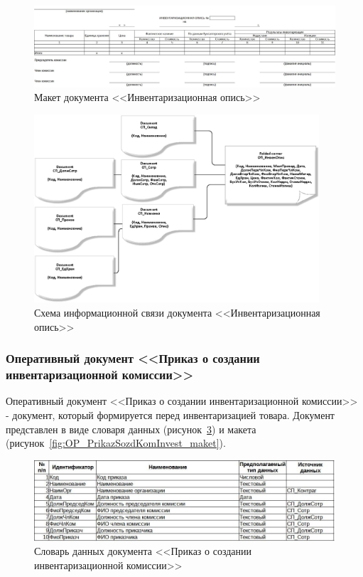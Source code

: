 \begin{figure}[!h]
    \centering
    \includegraphics[width=14cm]
        {_docs/ОП_ИнвенОпис_макет.jpg}
    \caption{Макет документа <<Инвентаризационная опись>>}
    \label{fig:OP_InvenOpis_maket}
\end{figure}

\begin{figure}[!h]
    \centering
    \includegraphics[height=7cm]
        {_docs/ОП_ИнвенОпис_связи.png}
    \caption{Схема информационной связи документа <<Инвентаризационная опись>>}
    \label{fig:OP_InvenOpis_svazi}
\end{figure}

\newpage
\subsubsection{Оперативный документ <<Приказ о создании инвентаризационной комиссии>>}

Оперативный документ <<Приказ о создании инвентаризационной комиссии>>
- документ, который формируется перед инвентаризацией товара.
Документ представлен в виде словаря данных (рисунок~\ref{fig:OP_PrikazSozdKomInvest_tipi})
и макета (рисунок~\ref{fig:OP_PrikazSozdKomInvest_maket}).

\begin{figure}[!h]
    \centering
    \includegraphics[width=14cm]
        {_docs/ОП_ПриказСоздКомИнвент_типы.jpg}
    \caption{Словарь данных документа <<Приказ о создании инвентаризационной комиссии>>}
    \label{fig:OP_PrikazSozdKomInvest_tipi}
\end{figure}


